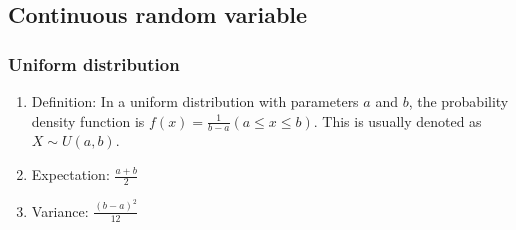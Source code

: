 \documentclass[a4paper]{article}
\begin{document}
\subsection{Continuous random variable}
	\subsubsection{Uniform distribution}
		\begin{enumerate}
		\item Definition: In a uniform distribution with parameters $a$ and $b$, the probability density function is $f(x)=\frac{1}{b-a}(a\leq x\leq b)$. This is usually denoted as $X\sim U(a,b)$.
		\item Expectation: $\frac{a+b}{2}$
		\item Variance:	$\frac{(b-a)^2}{12}$
		\end{enumerate}
\end{document}
